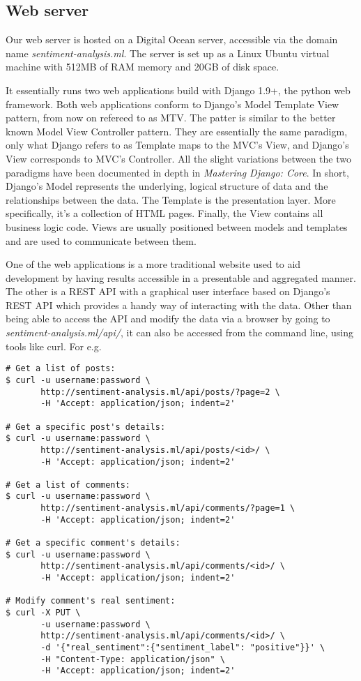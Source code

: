 \subsection{Web server}\label{sec:web-server}

Our web server is hosted on a Digital Ocean server, accessible via the domain name \textit{sentiment-analysis.ml}. The server is set up as a Linux Ubuntu virtual machine with 512MB of RAM memory and 20GB of disk space.

It essentially runs two web applications build with Django 1.9+, the python web framework. 
Both web applications conform to Django's Model Template View pattern, from now on refereed to as MTV.
The patter is similar to the better known Model View Controller pattern. 
They are essentially the same paradigm, only what Django refers to as Template maps to the MVC's View, and Django's View corresponds to MVC's Controller. 
All the slight variations between the two paradigms have been documented in depth in \textit{Mastering Django: Core}\cite{DjangoMTV}.
In short, Django’s Model represents the underlying, logical structure of data and the relationships between the data.
The Template is the presentation layer. More specifically, it's a collection of HTML pages.
Finally, the View contains all business logic code. Views are usually positioned between models and templates and are used to communicate between them.


One of the web applications is a more traditional website used to aid development by having results accessible in a presentable and aggregated manner. 
The other is a REST API with a graphical user interface based on Django's REST API which provides a handy way of interacting with the data. 
Other than being able to access the API and modify the data via a browser by going to \textit{sentiment-analysis.ml/api/}, it can also be accessed from the command line, using tools like curl. 
For e.g.
\begin{Verbatim}[formatcom=\color{darkgray},fontfamily=courier]
# Get a list of posts:
$ curl -u username:password \
       http://sentiment-analysis.ml/api/posts/?page=2 \
       -H 'Accept: application/json; indent=2'

# Get a specific post's details:
$ curl -u username:password \
       http://sentiment-analysis.ml/api/posts/<id>/ \
       -H 'Accept: application/json; indent=2'

# Get a list of comments:
$ curl -u username:password \
       http://sentiment-analysis.ml/api/comments/?page=1 \
       -H 'Accept: application/json; indent=2'

# Get a specific comment's details:
$ curl -u username:password \
       http://sentiment-analysis.ml/api/comments/<id>/ \
       -H 'Accept: application/json; indent=2'

# Modify comment's real sentiment:
$ curl -X PUT \
       -u username:password \
       http://sentiment-analysis.ml/api/comments/<id>/ \
       -d '{"real_sentiment":{"sentiment_label": "positive"}}' \
       -H "Content-Type: application/json" \
       -H 'Accept: application/json; indent=2'
\end{Verbatim}
